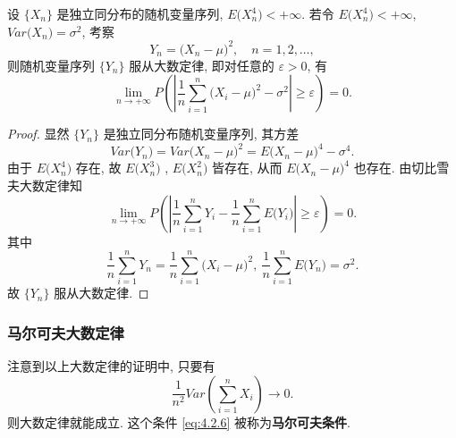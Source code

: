 \begin{example}\label{exam:4.2.2}
    设 $ \{ X_n \} $ 是独立同分布的随机变量序列, $ E \bigl( X_n^4 \bigr) < +\infty $. 若令 $ E \bigl( X_n^4 \bigr) < +\infty $, $ Var \bigl( X_n \bigr)= \sigma^2 $, 考察
    \begin{equation*}
        Y_n = \bigl( X_n - \mu \bigr)^2, \quad n = 1, 2, \dotsc,
    \end{equation*}
    则随机变量序列 $ \{ Y_n \} $ 服从大数定律, 即对任意的 $ \varepsilon > 0 $, 有
    \begin{equation*}
        \lim_{n \to +\infty} P \left( \left\lvert \frac{1}{n} \sum_{i=1}^n \bigl( X_i - \mu \bigr)^2 - \sigma^2 \right\rvert \geq \varepsilon \right) = 0.
    \end{equation*}
\end{example}

\begin{proof}
    显然 $ \{ Y_n \} $ 是独立同分布随机变量序列, 其方差
    \begin{equation*}
        Var \bigl( Y_n \bigr) = Var \bigl( X_n - \mu \bigr)^2 = E \bigl( X_n - \mu \bigr)^4 - \sigma^4.
    \end{equation*}
    由于 $ E \bigl( X_n^4 \bigr) $ 存在, 故 $ E \bigl( X_n^3 \bigr) $ ,  $ E \bigl( X_n^2 \bigr) $ 皆存在, 从而 $ E \bigl( X_n - \mu \bigr)^4 $ 也存在.
    由切比雪夫大数定律知
    \begin{equation*}
        \lim_{n \to +\infty} P \left( \left\lvert \frac{1}{n} \sum_{i=1}^n Y_i - \frac{1}{n} \sum_{i=1}^n E \bigl( Y_i \bigr) \right\rvert \geq \varepsilon \right) = 0.
    \end{equation*}
    其中
    \begin{equation*}
        \frac{1}{n} \sum_{i=1}^n Y_n = \frac{1}{n} \sum_{i=1}^n \bigl( X_i - \mu \bigr)^2, \ \frac{1}{n} \sum_{i=1}^n E \bigl( Y_n \bigr) = \sigma^2.
    \end{equation*}
    故 $ \{ Y_n \} $ 服从大数定律.
\end{proof}

\subsubsection{马尔可夫大数定律}

注意到以上大数定律的证明中, 只要有
\begin{equation*}\label{eq:4.2.6}
    \frac{1}{n^2} Var \left( \sum_{i=1}^n X_i \right) \to 0.
\end{equation*}
则大数定律就能成立.
这个条件 \ref{eq:4.2.6} 被称为\textbf{马尔可夫条件}.

